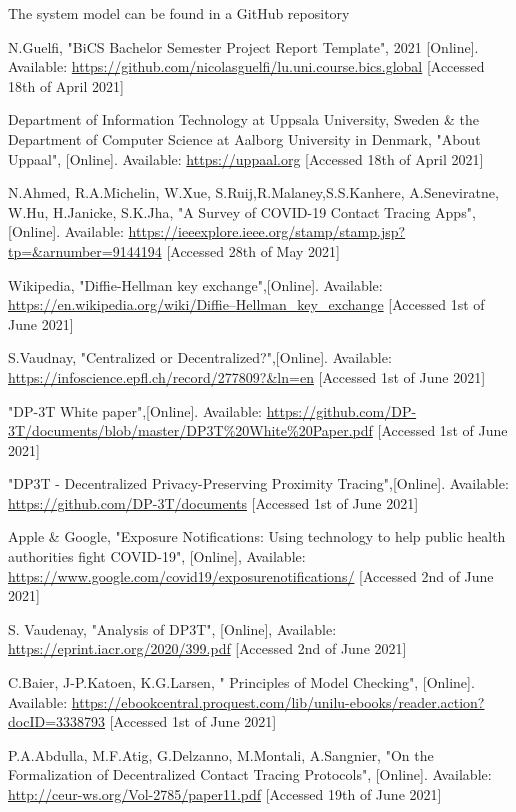 \documentclass[a4paper, twocolumn]{article}
\begin{document}
\noindent The system model can be found in a GitHub repository \cite{github}

\begin{thebibliography}{9}
N.Guelfi, "BiCS Bachelor Semester Project Report Template", 2021 [Online]. Available: \url{ https://github.com/nicolasguelfi/lu.uni.course.bics.global} 
[Accessed 18th of April 2021]

Department of Information Technology at Uppsala University, Sweden \& the Department of Computer Science at Aalborg University in Denmark, "About Uppaal", [Online]. Available: \url{https://uppaal.org} [Accessed 18th of April 2021]

N.Ahmed, R.A.Michelin, W.Xue, S.Ruij,R.Malaney,S.S.Kanhere, A.Seneviratne, W.Hu, H.Janicke, S.K.Jha, "A Survey of COVID-19 Contact Tracing Apps", [Online]. Available: \url{https://ieeexplore.ieee.org/stamp/stamp.jsp?tp=&arnumber=9144194} [Accessed 28th of May 2021]

Wikipedia, "Diffie-Hellman key exchange",[Online]. Available: \url{https://en.wikipedia.org/wiki/Diffie–Hellman_key_exchange} [Accessed 1st of June 2021]

S.Vaudnay, "Centralized or Decentralized?",[Online]. Available: \url{https://infoscience.epfl.ch/record/277809?&ln=en} [Accessed 1st of June 2021]

"DP-3T White paper",[Online]. Available: \url{https://github.com/DP-3T/documents/blob/master/DP3T\%20White\%20Paper.pdf} [Accessed 1st of June 2021]

"DP3T - Decentralized Privacy-Preserving Proximity Tracing",[Online]. Available: \url{https://github.com/DP-3T/documents} [Accessed 1st of June 2021]

Apple \& Google, "Exposure Notifications: Using technology to help public health authorities fight COVID-19", [Online], Available: \url{https://www.google.com/covid19/exposurenotifications/} [Accessed 2nd of June 2021]

S. Vaudenay, "Analysis of DP3T", [Online], Available: \url{https://eprint.iacr.org/2020/399.pdf} [Accessed 2nd of June 2021]

C.Baier, J-P.Katoen, K.G.Larsen, " Principles of Model Checking", [Online]. Available: \url{https://ebookcentral.proquest.com/lib/unilu-ebooks/reader.action?docID=3338793} [Accessed 1st of June 2021]

P.A.Abdulla, M.F.Atig, G.Delzanno, M.Montali, A.Sangnier, "On the Formalization of Decentralized Contact Tracing Protocols", [Online]. Available: \url{http://ceur-ws.org/Vol-2785/paper11.pdf} [Accessed 19th of June 2021]


\end{thebibliography}
\end{document}
